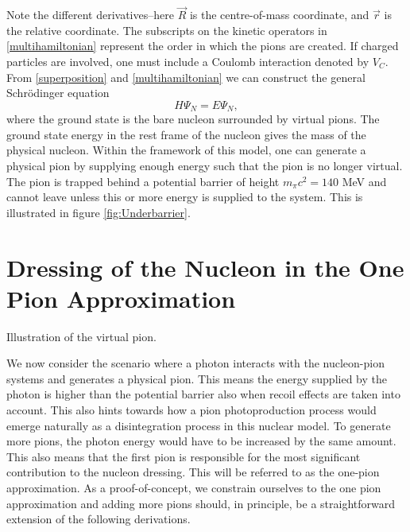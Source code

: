 Note the different derivatives--here $\vec{R}$ is the centre-of-mass coordinate, and $\vec{r}$ is the relative coordinate. The subscripts on the kinetic operators in \eqref{multihamiltonian} represent the order in which the pions are created. If charged particles are involved, one must include a Coulomb interaction denoted by $V_C$. From \eqref{superposition} and \eqref{multihamiltonian} we can construct the general Schrödinger equation
\begin{equation} \label{MultiSE}
	H \Psi_N = E \Psi_N,
\end{equation}
where the ground state is the bare nucleon surrounded by virtual pions. The ground state energy in the rest frame of the nucleon gives the mass of the physical nucleon. Within the framework of this model, one can generate a physical pion by supplying enough energy such that the pion is no longer virtual. The pion is trapped behind a potential barrier of height $m_\pi c^2 = 140$ MeV and cannot leave unless this or more energy is supplied to the system. This is illustrated in figure \ref{fig:Underbarrier}.
\section{Dressing of the Nucleon in the One Pion Approximation}\label{dressnuc}
\begin{marginfigure}
	\centering
	
	\caption{Illustration of the virtual pion.}
	\label{fig:Underbarrier}
\end{marginfigure}
We now consider the scenario where a photon interacts with the nucleon-pion systems and generates a physical pion. This means the energy supplied by the photon is higher than the potential barrier also when recoil effects are taken into account. This also hints towards how a pion photoproduction process would emerge naturally as a disintegration process in this nuclear model. To generate more pions, the photon energy would have to be increased by the same amount. This also means that the first pion is responsible for the most significant contribution to the nucleon dressing. This will be referred to as the one-pion approximation. As a proof-of-concept, we constrain ourselves to the one pion approximation and adding more pions should, in principle, be a straightforward extension of the following derivations.

